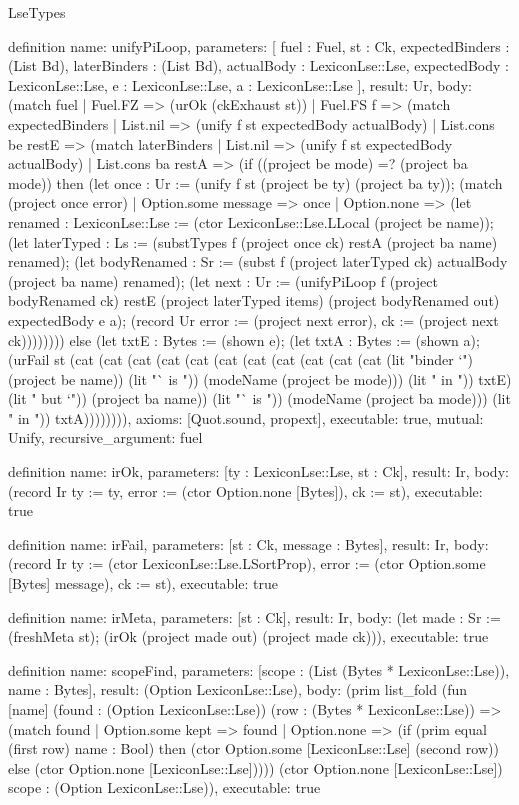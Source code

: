 \begin{lexlean}{LseTypes}
\begin{semanticmodule}
definition{
  name: unifyPiLoop,
  parameters: [
    fuel : Fuel,
    st : Ck,
    expectedBinders : (List Bd),
    laterBinders : (List Bd),
    actualBody : LexiconLse::Lse,
    expectedBody : LexiconLse::Lse,
    e : LexiconLse::Lse,
    a : LexiconLse::Lse
  ],
  result: Ur,
  body: (match fuel
    | Fuel.FZ => (urOk (ckExhaust st))
    | Fuel.FS f => (match expectedBinders
      | List.nil => (unify f st expectedBody actualBody)
      | List.cons be restE => (match laterBinders
        | List.nil => (unify f st expectedBody actualBody)
        | List.cons ba restA => (if ((project be mode) =? (project ba mode)) then (let once : Ur := (unify f st (project be ty) (project ba ty)); (match (project once error)
          | Option.some message => once
          | Option.none => (let renamed : LexiconLse::Lse := (ctor LexiconLse::Lse.LLocal (project be name)); (let laterTyped : Ls := (substTypes f (project once ck) restA (project ba name) renamed); (let bodyRenamed : Sr := (subst f (project laterTyped ck) actualBody (project ba name) renamed); (let next : Ur := (unifyPiLoop f (project bodyRenamed ck) restE (project laterTyped items) (project bodyRenamed out) expectedBody e a); (record Ur {error := (project next error), ck := (project next ck)}))))))) else (let txtE : Bytes := (shown e); (let txtA : Bytes := (shown a); (urFail st (cat (cat (cat (cat (cat (cat (cat (cat (cat (cat (cat (lit "binder `") (project be name)) (lit "` is ")) (modeName (project be mode))) (lit " in ")) txtE) (lit " but `")) (project ba name)) (lit "` is ")) (modeName (project ba mode))) (lit " in ")) txtA)))))))),
  axioms: [Quot.sound, propext],
  executable: true,
  mutual: Unify,
  recursive_argument: fuel
}

definition{
  name: irOk,
  parameters: [ty : LexiconLse::Lse, st : Ck],
  result: Ir,
  body: (record Ir {ty := ty, error := (ctor Option.none [Bytes]), ck := st}),
  executable: true
}

definition{
  name: irFail,
  parameters: [st : Ck, message : Bytes],
  result: Ir,
  body: (record Ir {ty := (ctor LexiconLse::Lse.LSortProp), error := (ctor Option.some [Bytes] message), ck := st}),
  executable: true
}

definition{
  name: irMeta,
  parameters: [st : Ck],
  result: Ir,
  body: (let made : Sr := (freshMeta st); (irOk (project made out) (project made ck))),
  executable: true
}

definition{
  name: scopeFind,
  parameters: [scope : (List (Bytes * LexiconLse::Lse)), name : Bytes],
  result: (Option LexiconLse::Lse),
  body: (prim list_fold (fun [name] (found : (Option LexiconLse::Lse)) (row : (Bytes * LexiconLse::Lse)) => (match found
    | Option.some kept => found
    | Option.none => (if (prim equal (first row) name : Bool) then (ctor Option.some [LexiconLse::Lse] (second row)) else (ctor Option.none [LexiconLse::Lse])))) (ctor Option.none [LexiconLse::Lse]) scope : (Option LexiconLse::Lse)),
  executable: true
}


\end{semanticmodule}
\end{lexlean}
